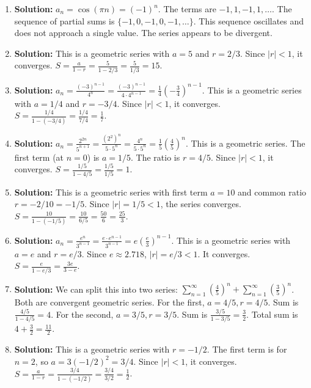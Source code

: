 \documentclass[12pt]{article}
\begin{document}
\begin{enumerate}
    \item \textbf{Solution:} $a_n = \cos(\pi n) = (-1)^n$. The terms are $-1, 1, -1, 1, \dots$. The sequence of partial sums is $\{-1, 0, -1, 0, -1, \dots\}$. This sequence oscillates and does not approach a single value. The series appears to be divergent.

    \item \textbf{Solution:} This is a geometric series with $a=5$ and $r=2/3$. Since $|r| < 1$, it converges. $S = \frac{a}{1-r} = \frac{5}{1-2/3} = \frac{5}{1/3} = 15$.

    \item \textbf{Solution:} $a_n = \frac{(-3)^{n-1}}{4^n} = \frac{(-3)^{n-1}}{4 \cdot 4^{n-1}} = \frac{1}{4} \left(-\frac{3}{4}\right)^{n-1}$. This is a geometric series with $a=1/4$ and $r=-3/4$. Since $|r| < 1$, it converges. $S = \frac{1/4}{1 - (-3/4)} = \frac{1/4}{7/4} = \frac{1}{7}$.

    \item \textbf{Solution:} $a_n = \frac{2^{2n}}{5^{n+1}} = \frac{(2^2)^n}{5 \cdot 5^n} = \frac{4^n}{5 \cdot 5^n} = \frac{1}{5}\left(\frac{4}{5}\right)^n$. This is a geometric series. The first term (at $n=0$) is $a=1/5$. The ratio is $r=4/5$. Since $|r| < 1$, it converges. $S = \frac{1/5}{1 - 4/5} = \frac{1/5}{1/5} = 1$.

    \item \textbf{Solution:} This is a geometric series with first term $a=10$ and common ratio $r = -2/10 = -1/5$. Since $|r| = 1/5 < 1$, the series converges. $S = \frac{10}{1 - (-1/5)} = \frac{10}{6/5} = \frac{50}{6} = \frac{25}{3}$.

    \item \textbf{Solution:} $a_n = \frac{e^n}{3^{n-1}} = \frac{e \cdot e^{n-1}}{3^{n-1}} = e \left(\frac{e}{3}\right)^{n-1}$. This is a geometric series with $a=e$ and $r=e/3$. Since $e \approx 2.718$, $|r| = e/3 < 1$. It converges. $S = \frac{e}{1-e/3} = \frac{3e}{3-e}$.

    \item \textbf{Solution:} We can split this into two series: $\sum_{n=1}^\infty \left(\frac{4}{5}\right)^n + \sum_{n=1}^\infty \left(\frac{3}{5}\right)^n$. Both are convergent geometric series.
    For the first, $a = 4/5, r=4/5$. Sum is $\frac{4/5}{1-4/5} = 4$.
    For the second, $a = 3/5, r=3/5$. Sum is $\frac{3/5}{1-3/5} = \frac{3}{2}$.
    Total sum is $4 + \frac{3}{2} = \frac{11}{2}$.

    \item \textbf{Solution:} This is a geometric series with $r=-1/2$. The first term is for $n=2$, so $a = 3(-1/2)^2 = 3/4$. Since $|r|<1$, it converges. $S = \frac{a}{1-r} = \frac{3/4}{1 - (-1/2)} = \frac{3/4}{3/2} = \frac{1}{2}$.
    

\end{enumerate}
\end{document}

